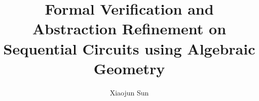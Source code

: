 \documentclass[Chicago]{uuthesis2e}
\title{Formal Verification and Abstraction Refinement on Sequential Circuits using Algebraic Geometry}
\author{Xiaojun Sun}
\newcommand{\ls}[1]
    {\dimen0=\fontdimen6\the\font
     \lineskip=#1\dimen0
     \advance\lineskip.5\fontdimen5\the\font
     \advance\lineskip-\dimen0
     \lineskiplimit=.9\lineskip
     \baselineskip=\lineskip
     \advance\baselineskip\dimen0
     \normallineskip\lineskip
     \normallineskiplimit\lineskiplimit
     \normalbaselineskip\baselineskip
     \ignorespaces
    }
\begin{document}

\frontmatterformat
\titlepage
\copyrightpage
\committeeapproval
\readingapproval

\tableofcontents
\listoffigures
\listoftables


\maintext       %





%
%
%
%
%
%











\end{document}
